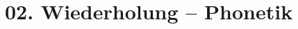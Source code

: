 \documentclass[handout,aspectratio=1610,dvipsnames]{beamer}
\begin{document}
  \section[Phonetik]{02. Wiederholung -- Phonetik}
  \let\woopsi\section\let\section\subsection\let\subsection\subsubsection
  
  \let\subsection\section\let\section\woopsi
  
\end{document}

